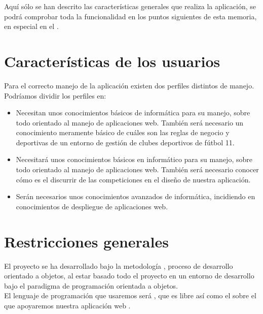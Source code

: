 Aquí sólo se han descrito las características generales que realiza la
aplicación, se podrá comprobar toda la funcionalidad en los puntos
siguientes de esta memoria, en especial en el .

\section{Características de los usuarios}

Para el correcto manejo de la aplicación  existen dos perfiles distintos de manejo.\\

Podríamos dividir los perfiles en:

\begin{itemize}
  \item {} Necesitan unos conocimientos
    básicos de informática para su manejo, sobre todo orientado al
    manejo de aplicaciones web. También será necesario un conocimiento
    meramente básico de cuáles son las reglas de negocio y deportivas
    de un entorno de gestión de clubes deportivos de fútbol 11.
  \item {} Necesitará unos
    conocimientos básicos en informático para su manejo, sobre todo
    orientado al manejo de aplicaciones web. También será necesario
    conocer cómo es el discurrir de las competiciones en el diseño de
    nuestra aplicación.
  \item {} Serán necesarios unos
    conocimientos avanzados de informática, incidiendo en
    conocimientos de despliegue de aplicaciones web. 
\end{itemize}

\section{Restricciones generales}
El proyecto se ha desarrollado bajo la metodología , proceso de desarrollo orientado a objetos, al estar
basado todo el proyecto en un entorno de desarrollo bajo el paradigma
de programación orientada a objetos.\\

El lenguaje de programación que usaremos será , que es
libre así como el  sobre el que apoyaremos nuestra
aplicación web .\\

